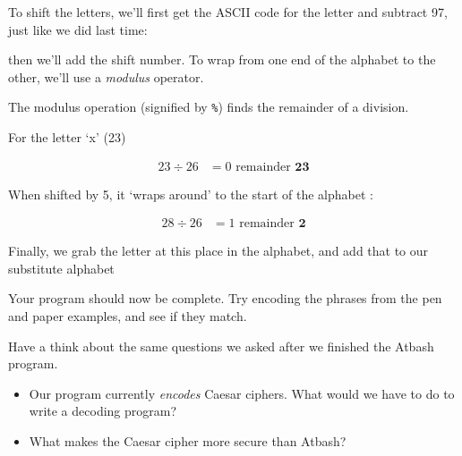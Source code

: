 		To shift the letters, we'll first get the ASCII code for the letter and subtract 97, just like we did last time:
		
		
		
		then we'll add the shift number. To wrap from one end of the alphabet to the other, we'll use a \textit{modulus} operator.
		
		

		\ifprint\else
			\begin{aside}
				The modulus operation (signified by \texttt{\%}) finds the remainder of a division.
				
				For the letter `x' (23)
				
				\begin{align*}
					23 \div 26 &= 0 \text{ remainder } \textbf{23}
				\end{align*}
				
				When shifted by 5, it `wraps around' to the start of the alphabet :
				
				\begin{align*}
					28 \div 26 &= 1 \text{ remainder } \textbf{2}
				\end{align*}
				
			\end{aside}
		\fi
		
		Finally, we grab the letter at this place in the alphabet, and add that to our substitute alphabet
		
		
		
		Your program should now be complete. Try encoding the phrases from the pen and paper examples, and see if they match.
		
		Have a think about the same questions we asked after we finished the Atbash program.
		
		\ifprint\else
			\begin{itemize}[nosep]
				\item Our program currently \textit{encodes} Caesar ciphers. What would we have to do to write a decoding program?
				\item What makes the Caesar cipher more secure than Atbash?
			\end{itemize}
		\fi

